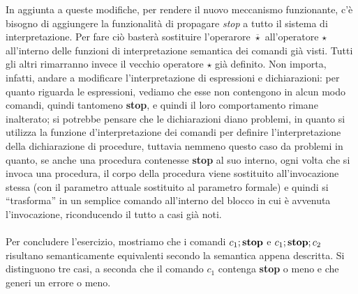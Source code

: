     In aggiunta a queste modifiche, per rendere il nuovo meccanismo funzionante, c'è bisogno di aggiungere la funzionalità di propagare \textit{stop} a tutto il sistema di interpretazione. Per fare ciò basterà sostituire l'operarore $\overline{\star}$ all'operatore $\star$ all'interno delle funzioni di interpretazione semantica dei comandi già visti. Tutti gli altri rimarranno invece il vecchio operatore $\star$ già definito. Non importa, infatti, andare a modificare l'interpretazione di espressioni e dichiarazioni: per quanto riguarda le espressioni, vediamo che esse non contengono in alcun modo comandi, quindi tantomeno \textbf{stop}, e quindi il loro comportamento rimane inalterato; si potrebbe pensare che le dichiarazioni diano problemi, in quanto si utilizza la funzione d'interpretazione dei comandi per definire l'interpretazione della dichiarazione di procedure, tuttavia nemmeno questo caso da problemi in quanto, se anche una procedura contenesse \textbf{stop} al suo interno, ogni volta che si invoca una procedura, il corpo della procedura viene sostituito all'invocazione stessa (con il parametro attuale sostituito al parametro formale) e quindi si ``trasforma'' in un semplice comando all'interno del blocco in cui è avvenuta l'invocazione, riconducendo il tutto a casi già noti.\\
    \\
    Per concludere l'esercizio, mostriamo che i comandi $c_1;\mbox{\textbf{stop}}$ e $c_1;\mbox{\textbf{stop}};c_2$ risultano semanticamente equivalenti secondo la semantica appena descritta. Si distinguono tre casi, a seconda che il comando $c_1$ contenga \textbf{stop} o meno e che generi un errore o meno.
    
